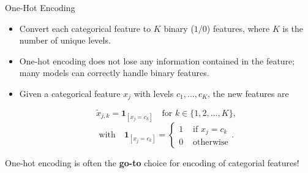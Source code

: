 \begin{vbframe}{One-Hot Encoding}
  \begin{itemize}
    \item Convert each categorical feature to $K$ binary ($1/0$) features, where $K$ is the number of unique levels.
    \item One-hot encoding does not lose any information contained in the feature;  many models can correctly handle binary features.
    \item Given a categorical feature $x_j$ with levels $c_1,\dots, c_K$, the new features are
          
          $$
            \tilde x_{j,k} = \mathbf{1}_{[x_j = c_k]} \quad \text{for } k \in \{1, 2, ..., K\},
          $$
          $$
            \text{with}\quad \mathbf{1}_{[x_j = c_k]} = \begin{cases} 1 & \text{ if } x_j = c_k \\
              0 & \text{ otherwise}\end{cases}\text{.}
          $$
  \end{itemize}
  
  \lz 
  
  One-hot encoding is often the \textbf{go-to} choice for encoding of categorial features! 
  
\end{vbframe}

